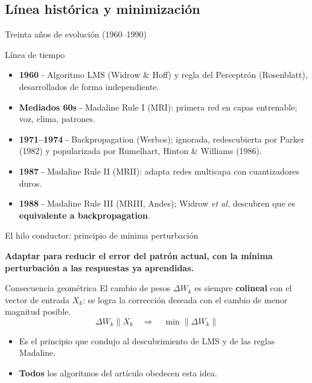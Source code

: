 \documentclass[aspectratio=169, 11pt, xcolor={dvipsnames,table}]{beamer}
\newcommand{\azul}[1]{\textcolor{UsachAzul}{#1}}
\begin{document}
\subsection{Línea histórica y minimización}
\begin{frame}{Treinta años de evolución (1960--1990)}
\begin{block}{Línea de tiempo}
\begin{itemize}
  \item \textbf{1960} - Algoritmo \azul{LMS} (Widrow \& Hoff) y regla del \azul{Perceptrón} (Rosenblatt), desarrollados de forma independiente.
  \item \textbf{Mediados 60s} - \azul{Madaline Rule I} (MRI): primera red en capas entrenable; voz, clima, patrones.
  \item \textbf{1971--1974} - \azul{Backpropagation} (Werbos); ignorada, redescubierta por Parker (1982) y popularizada por Rumelhart, Hinton \& Williams (1986).
  \item \textbf{1987} - \azul{Madaline Rule II} (MRII): adapta redes multicapa con cuantizadores duros.
  \item \textbf{1988} - \azul{Madaline Rule III} (MRIII, Andes); Widrow \emph{et al.} descubren que es \textbf{equivalente a backpropagation}.
\end{itemize}
\end{block}
\end{frame}

\begin{frame}{El hilo conductor: principio de mínima perturbación}
\begin{ideaclave}
\textbf{Adaptar para reducir el error del patrón actual, con la mínima perturbación a las
respuestas ya aprendidas.}
\end{ideaclave}
\begin{block}{Consecuencia geométrica}
El cambio de pesos $\Delta W_k$ es siempre \textbf{colineal} con el vector de entrada $X_k$: se logra
la corrección deseada con el cambio de \azul{menor magnitud posible}.
\[
  \Delta W_k \parallel X_k \quad\Longrightarrow\quad \min \lVert \Delta W_k \rVert
\]
\end{block}
\begin{itemize}
  \item Es el principio que condujo al descubrimiento de LMS y de las reglas Madaline.
  \item \textbf{Todos} los algoritmos del artículo obedecen esta idea.
\end{itemize}
\end{frame}
\end{document}
